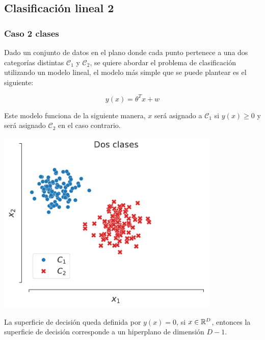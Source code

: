 \subsection{Clasificación lineal 2}


\subsubsection{Caso 2 clases}

\begin{minipage}{0.4\textwidth}
    Dado un conjunto de datos en el plano donde cada punto pertenece a una dos categorías distintas $\mathcal{C}_1$ y $\mathcal{C}_2$, se quiere abordar el problema de clasificación utilizando un modelo lineal, el modelo más simple que se puede plantear es el siguiente:
    
    \begin{equation}
        y(x) = \theta^Tx + w
    \end{equation}
    
    Este modelo funciona de la siguiente manera, $x$ será asignado a $\mathcal{C}_1$ si $y(x) \geq 0$ y será asignado $\mathcal{C}_2$ en el caso contrario.
\end{minipage}\hfill
\begin{minipage}{0.5\textwidth}
    \centering
    \includegraphics[width=0.8\textwidth]{img/cap2_dosclases}\\
    \label{fig:puntos_2d}
\end{minipage}

\vspace{1cm}
La superficie de decisión queda definida por $y(x)=0$, si $x\in{\mathbb R}^D$, entonces la superficie de decisión corresponde a un hiperplano de dimensión $D-1$.

